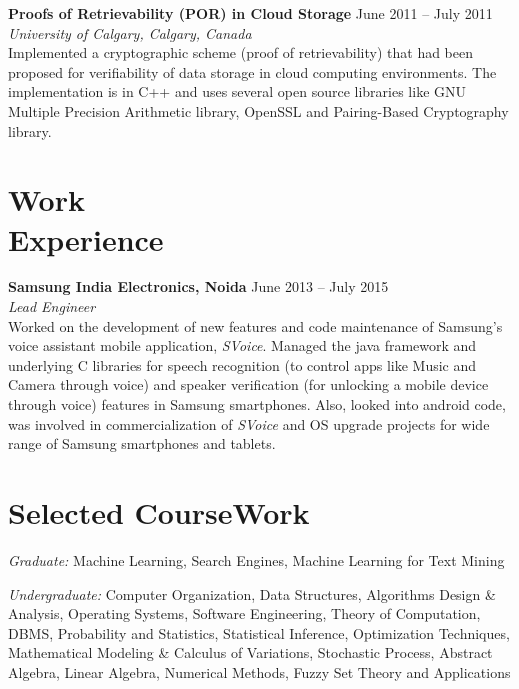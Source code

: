 \documentclass[margin,line]{resume}
\begin{document}
\begin{resume}
        \pagebreak
        
		\textbf{Proofs of Retrievability (POR) in Cloud Storage} \hfill June 2011 -- July 2011 \\
		\textit{University of Calgary, Calgary, Canada} \\
		Implemented a cryptographic scheme (proof of retrievability) that had been proposed for verifiability of data storage in cloud computing environments. The implementation is in C++ and uses several open 				source libraries like GNU Multiple Precision Arithmetic library, OpenSSL and Pairing-Based Cryptography library. 


\section{\mysidestyle Work\\Experience}
    		\textbf{Samsung India Electronics, Noida} \hfill June 2013 -- July 2015\\
		\textit{Lead Engineer}\\
		 Worked on the development of new features and code maintenance of Samsung's voice assistant mobile application, \textit{SVoice}. Managed the java framework and underlying C libraries for speech recognition (to control apps like Music and Camera through voice) and speaker verification (for unlocking a mobile device through voice) features in Samsung smartphones. Also, looked into android code, was involved in \mbox{commercialization} of \textit{SVoice} and OS upgrade projects for wide range of Samsung smartphones and tablets.


\section{\mysidestyle Selected CourseWork}
	
		\textit{Graduate: }Machine Learning, Search Engines, Machine Learning for Text Mining

   		\textit{Undergraduate: }Computer Organization,  Data Structures, Algorithms Design \& Analysis, Operating Systems, Software Engineering, Theory of Computation, DBMS, Probability and Statistics, Statistical Inference, Optimization Techniques, Mathematical Modeling \& Calculus of Variations, Stochastic Process, Abstract Algebra, Linear  Algebra, Numerical Methods, Fuzzy Set Theory and Applications



\end{resume}
\end{document}
